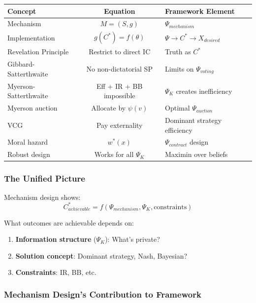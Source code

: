 \begin{center}
\renewcommand{\arraystretch}{1.5}
\begin{tabular}{|l|c|l|}
\hline
\textbf{Concept} & \textbf{Equation} & \textbf{Framework Element} \\
\hline
Mechanism & $M = (S, g)$ & $\Psi_{mechanism}$ \\
\hline
Implementation & $g(C^*) = f(\theta)$ & $\Psi \to C^* \to X_{desired}$ \\
\hline
Revelation Principle & Restrict to direct IC & Truth as $C^*$ \\
\hline
Gibbard-Satterthwaite & No non-dictatorial SP & Limits on $\Psi_{voting}$ \\
\hline
Myerson-Satterthwaite & Eff + IR + BB impossible & $\Psi_K$ creates inefficiency \\
\hline
Myerson auction & Allocate by $\psi(v)$ & Optimal $\Psi_{auction}$ \\
\hline
VCG & Pay externality & Dominant strategy efficiency \\
\hline
Moral hazard & $w^*(x)$ & $\Psi_{contract}$ design \\
\hline
Robust design & Works for all $\Psi_K$ & Maximin over beliefs \\
\hline
\end{tabular}
\end{center}

\subsubsection{The Unified Picture}

Mechanism design shows:
\begin{equation}
\boxed{
C^*_{achievable} = f(\Psi_{mechanism}, \Psi_K, \text{constraints})
}
\end{equation}

What outcomes are achievable depends on:
\begin{enumerate}
    \item \textbf{Information structure} ($\Psi_K$): What's private?
    \item \textbf{Solution concept}: Dominant strategy, Nash, Bayesian?
    \item \textbf{Constraints}: IR, BB, etc.
\end{enumerate}

\subsubsection{Mechanism Design's Contribution to Framework}

